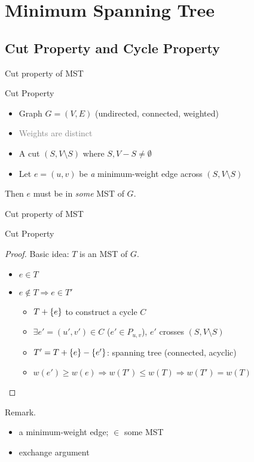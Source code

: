 \section{Minimum Spanning Tree}

\subsection{Cut Property and Cycle Property}

\begin{frame}{Cut property of MST}
  \begin{exampleblock}{Cut Property }
    \begin{itemize}
	  \item Graph $G = (V, E)$ (undirected, connected, weighted)
	  \item \textcolor{gray}{Weights are distinct}
	  \item A cut $(S, V \setminus S)$ where $S, V-S \neq \emptyset$
	  \item Let $e = (u,v)$ be \emph{a} minimum-weight edge across $(S, V \setminus S)$
	\end{itemize}
	Then $e$ must be in \emph{some} MST of $G$.
  \end{exampleblock}

\end{frame}
\begin{frame}{Cut property of MST}
  \begin{block}{Cut Property }
    \begin{proof}
      Basic idea: $T$ is an MST of $G$.
      \begin{itemize}
	\item $e \in T$
	\item $e \notin T \Rightarrow e \in T'$
	  \begin{itemize}
	    \item $T + \{e\}$ to construct a cycle $C$
	    \item $\exists e' = (u',v') \in C$ ($e' \in P_{u,v}$), $e'$ crosses $(S, V \setminus S)$
	    \item $T' = T + \{e\} - \{e'\}$: spanning tree (connected, acyclic)
	    \item $w(e') \geq w(e) \Rightarrow w(T') \le w(T) \Rightarrow w(T') = w(T)$
	  \end{itemize}
      \end{itemize}
    \end{proof}
  \end{block}

  \begin{alertblock}{Remark.}
    \begin{itemize}
      \item a minimum-weight edge; $\in$ some MST
      \item exchange argument
    \end{itemize}
  \end{alertblock}
\end{frame}
